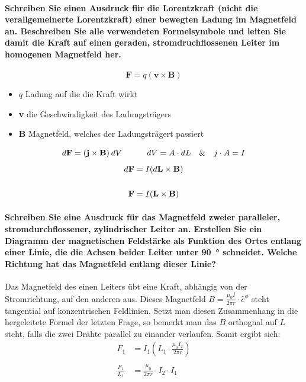 \documentclass[a4paper, 11pt, parskip=half]{scrartcl}
\begin{document}
\paragraph{Schreiben Sie einen Ausdruck für die Lorentzkraft (nicht die verallgemeinerte
Lorentzkraft) einer bewegten Ladung im Magnetfeld an. Beschreiben Sie alle verwendeten Formelsymbole
und leiten Sie damit die Kraft auf einen geraden, stromdruchflossenen Leiter im homogenen Magnetfeld
her.}
\begin{equation}
    \textbf{F} = q(\textbf{v} \times \textbf{B})
\end{equation}
\begin{itemize}
    \item $q$ Ladung auf die die Kraft wirkt 
    \item \textbf{v} die Geschwindigkeit des Ladungsträgers
    \item \textbf{B} Magnetfeld, welches der Ladungsträgert passiert
\end{itemize}
\begin{equation}
    d\textbf{F} = (\textbf{j} \times \textbf{B})\hspace{0.2em} dV \hspace{3em} dV = A\cdot dL \hspace{1em}\& \hspace{1em} j \cdot A = I
\end{equation}
\begin{align}
    d\textbf{F} &= I (d\textbf{L} \times \textbf{B})  \\
    \notag \\ 
    \textbf{F} &= I (\textbf{L} \times \textbf{B})
\end{align}
\paragraph{Schreiben Sie eine Ausdruck für das Magnetfeld zweier paralleler, stromdurchflossener,
zylindrischer Leiter an. Erstellen Sie ein Diagramm der magnetischen Feldstärke als Funktion des
Ortes entlang einer Linie, die die Achsen beider Leiter unter \SI{90}{\degree} schneidet. Welche
Richtung hat das Magnetfeld entlang dieser Linie?} 
\vspace{1em}
Das Magnetfeld des einen Leiters übt eine Kraft, abhängig von der Stromrichtung, auf den anderen aus.
Dieses Magnetfeld  $B = \frac{\mu_0 I}{2 \pi r} \cdot \hat{e}^{\phi}$ steht tangential auf konzentrischen Feldlinien.
Setzt man diesen Zusammenhang in die hergeleitete Formel der letzten Frage, so bemerkt man das $B$ orthognal auf $L$ steht, falls die zwei Drähte parallel zu einander verlaufen. 
Somit ergibt sich:
\begin{align}
    F_1 &= I_1(L_1 \cdot \frac{\mu_0 I_2}{2 \pi r} ) \\
    \\
    \frac{F_1}{L_1} &= \frac{\mu_0}{2 \pi r} \cdot I_2 \cdot I_1
\end{align}
\newpage
\end{document}
